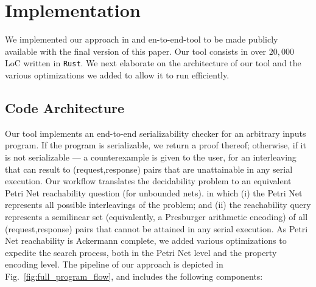 

\section{Implementation}
\label{sec:implementation}

We implemented our approach in and en-to-end-tool to be made publicly available with the final version of this paper. Our tool consists in over $20{,}000$ LoC written in \texttt{Rust}.
%
We next elaborate on the architecture of our tool and the various optimizations we added to allow it to run efficiently.





\subsection{Code Architecture}

\label{subsec:codeArchitecture}

Our tool implements an end-to-end serializability checker for an arbitrary inputs program. If the program is serializable, we return a proof thereof; otherwise, if it is not serializable --- a counterexample is given to the user, for an interleaving that can result to (request,response) pairs that are unattainable in any serial execution.
%
Our workflow translates the decidability problem to an equivalent Petri Net reachability question (for unbounded nets). in which (i) the Petri Net represents all possible interleavings of the problem; and (ii) the reachability query represents a semilinear set (equivalently, a Presburger arithmetic encoding) of all (request,response) pairs that cannot be attained in any serial execution.
%
As Petri Net reachability is Ackermann complete, we added various optimizations to expedite the search process, both in the Petri Net level and the property encoding level.
%
The pipeline of our approach is depicted in Fig.~\ref{fig:full_program_flow}, and includes the following components:
 

